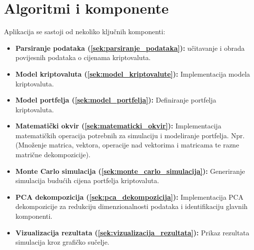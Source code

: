 \documentclass[zavrsnirad, upload]{fer}
\begin{document}
\section{Algoritmi i komponente}
\label{sek:algoritmi_i_komponente}
Aplikacija se sastoji od nekoliko ključnih komponenti:
\begin{itemize}
    \item \textbf{Parsiranje podataka (\ref{sek:parsiranje_podataka}):} učitavanje i obrada povijesnih
    podataka o cijenama kriptovaluta.

\item \textbf{Model kriptovaluta (\ref{sek:model_kriptovalute}):} Implementacija modela kriptovaluta.

    \item \textbf{Model portfelja (\ref{sek:model_portfelja}):} Definiranje portfelja kriptovaluta.

    \item \textbf{Matematički okvir (\ref{sek:matematicki_okvir}):} Implementacija matematičkih
    operacija potrebnih za simulaciju i modeliranje portfelja. Npr.
        (Množenje matrica, vektora, operacije nad vektorima i matricama te
        razne matrične dekompozicije).

    \item \textbf{Monte Carlo simulacija (\ref{sek:monte_carlo_simulacija}):} Generiranje simulacija
    budućih cijena portfelja kriptovaluta.

    \item \textbf{PCA dekompozicija (\ref{sek:pca_dekompozicija}):} Implementacija PCA dekompozicije
    za redukciju dimenzionalnosti podataka i identifikaciju glavnih
    komponenti.

    \item \textbf{Vizualizacija rezultata (\ref{sek:vizualizacija_rezultata}):} Prikaz rezultata simulacija
    kroz grafičko sučelje.
\end{itemize}
\end{document}
